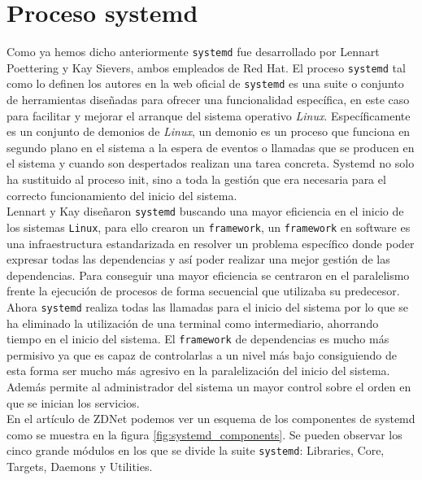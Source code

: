 \section{Proceso systemd} %

Como ya hemos dicho anteriormente \texttt{systemd} fue desarrollado por Lennart Poettering y Kay Sievers, ambos empleados de Red Hat.
El proceso \texttt{systemd} tal como lo definen los autores en la web oficial de \texttt{systemd} \cite{systemd} es una suite o conjunto de herramientas diseñadas para ofrecer una funcionalidad específica, en este caso para facilitar y mejorar el arranque del sistema operativo \textit{Linux}. Específicamente es un conjunto de demonios de \textit{Linux}, un demonio \cite{daemons} es un proceso que funciona en segundo plano en el sistema a la espera de eventos o llamadas que se producen en el sistema y cuando son despertados realizan una tarea concreta. Systemd no solo ha sustituido al proceso init, sino a toda la gestión que era necesaria para el correcto funcionamiento del inicio del sistema.\\

Lennart y Kay diseñaron \texttt{systemd} buscando una mayor eficiencia en el inicio de los sistemas \texttt{Linux}, para ello crearon un \texttt{framework}, un \texttt{framework} en software es una infraestructura estandarizada en resolver un problema específico donde poder expresar todas las dependencias y así poder realizar una mejor gestión de las dependencias. Para conseguir una mayor eficiencia se centraron en el paralelismo frente la ejecución de procesos de forma secuencial que utilizaba su predecesor. Ahora \texttt{systemd} realiza todas las llamadas para el inicio del sistema por lo que se ha eliminado la utilización de una terminal como intermediario, ahorrando tiempo en el inicio del sistema. El \texttt{framework} de dependencias es mucho más permisivo ya que es capaz de controlarlas a un nivel más bajo consiguiendo de esta forma ser mucho más agresivo en la paralelización del inicio del sistema. Además permite al administrador del sistema un mayor control sobre el orden en que se inician los servicios.\\


En el artículo de ZDNet \cite{zdnet} podemos ver un esquema de los componentes de systemd como se muestra en la figura \ref{fig:systemd_components}. Se pueden observar los cinco grande módulos en los que se divide la suite \texttt{systemd}: Libraries, Core, Targets, Daemons y Utilities.

